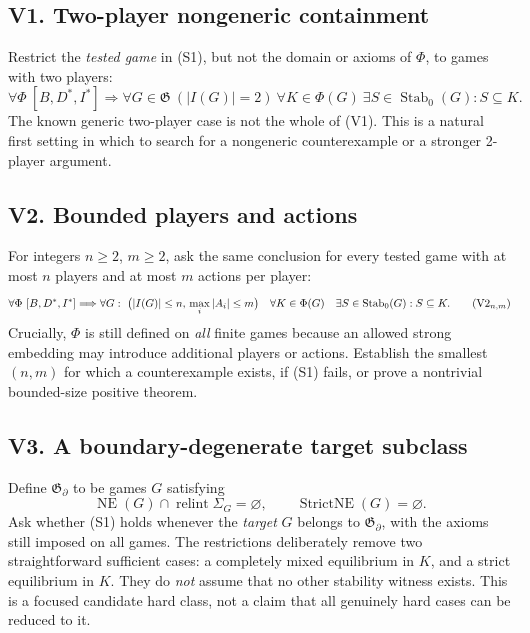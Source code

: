 \documentclass[11pt]{article}
\newcommand{\NE}{\operatorname{NE}}
\newcommand{\Stab}{\operatorname{Stab}_0}
\DeclareMathOperator{\relint}{relint}
\begin{document}
\subsection*{V1. Two-player nongeneric containment}
Restrict the \emph{tested game} in (S1), but not the domain or axioms
of $\Phi$, to games with two players:
\[
 \forall\Phi\ [B,D^*,I^*]\Longrightarrow
 \forall G\in\mathfrak G\ (|I(G)|=2)\ \forall K\in\Phi(G)
 \ \exists S\in\Stab(G):S\subseteq K.
 \tag{V1}
\]
The known generic two-player case is not the whole of (V1).
This is a natural first setting in which to search for a nongeneric
counterexample or a stronger 2-player argument.

\subsection*{V2. Bounded players and actions}
For integers $n\ge2$, $m\ge2$, ask the same conclusion for every
tested game with at most $n$ players and at most $m$ actions per player:
\[
  \forall\Phi\ [B,D^*,I^*]\Longrightarrow
  \forall G:\ \bigl(|I(G)|\le n,\,\max_i|A_i|\le m\bigr)
  \quad\forall K\in\Phi(G)\quad
  \exists S\in\Stab(G): S\subseteq K.
  \tag{V2$_{n,m}$}
\]
Crucially, $\Phi$ is still defined on \emph{all} finite games because
an allowed strong embedding may introduce additional players or actions.
Establish the smallest $(n,m)$ for which a counterexample exists, if
(S1) fails, or prove a nontrivial bounded-size positive theorem.

\subsection*{V3. A boundary-degenerate target subclass}
Define $\mathfrak G_{\partial}$ to be games $G$ satisfying
\[
  \NE(G)\cap\relint\Sigma_G=\varnothing,
  \qquad
  \operatorname{StrictNE}(G)=\varnothing.
\]
Ask whether (S1) holds whenever the \emph{target} $G$ belongs to
$\mathfrak G_{\partial}$, with the axioms still imposed on all games.
The restrictions deliberately remove two straightforward sufficient
cases: a completely mixed equilibrium in $K$, and a strict equilibrium
in $K$. They do \emph{not} assume that no other stability witness exists.
This is a focused candidate hard class, not a claim that all genuinely
hard cases can be reduced to it.
\end{document}
